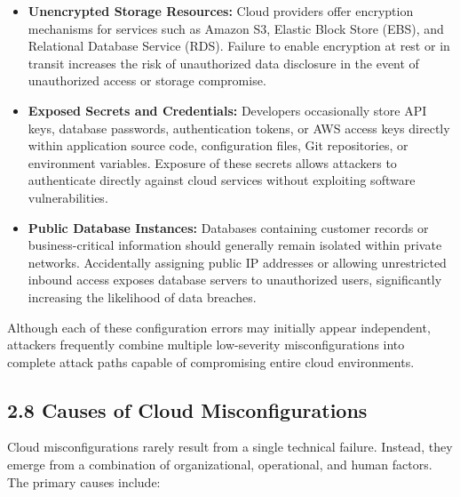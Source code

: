 \begin{itemize}
\item
  \textbf{Unencrypted Storage Resources:} Cloud providers offer encryption mechanisms for services such as Amazon S3, Elastic Block Store (EBS), and Relational Database Service (RDS). Failure to enable encryption at rest or in transit increases the risk of unauthorized data disclosure in the event of unauthorized access or storage compromise.\\
\item
  \textbf{Exposed Secrets and Credentials:} Developers occasionally store API keys, database passwords, authentication tokens, or AWS access keys directly within application source code, configuration files, Git repositories, or environment variables. Exposure of these secrets allows attackers to authenticate directly against cloud services without exploiting software vulnerabilities.\\
\item
  \textbf{Public Database Instances:} Databases containing customer records or business-critical information should generally remain isolated within private networks. Accidentally assigning public IP addresses or allowing unrestricted inbound access exposes database servers to unauthorized users, significantly increasing the likelihood of data breaches.
\end{itemize}

Although each of these configuration errors may initially appear independent, attackers frequently combine multiple low-severity misconfigurations into complete attack paths capable of compromising entire cloud environments.

\subsection{2.8 Causes of Cloud Misconfigurations}

Cloud misconfigurations rarely result from a single technical failure. Instead, they emerge from a combination of organizational, operational, and human factors. The primary causes include:

